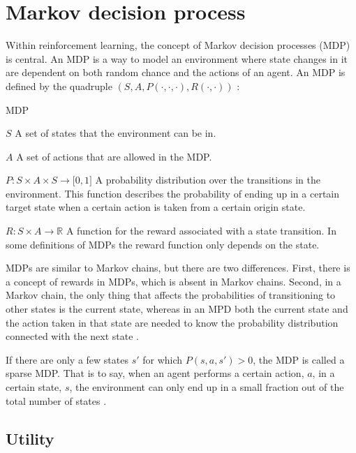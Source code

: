 \section{Markov decision process}
\label{sec:mdps}

Within reinforcement learning, the concept of Markov decision processes (MDP) is central. An MDP is a way to model an environment where state changes in it are dependent on both random chance and the actions of an agent. An MDP is defined by the quadruple $\left( S, A, P( \cdot , \cdot, \cdot ) , R( \cdot , \cdot ) \right)$ \parencite{altman2002applications}:

\begin{definition}{MDP}

$S$ \quad A set of states that the environment can be in.

$A$ \quad A set of actions that are allowed in the MDP.

$P \colon S \times A \times S \to \mathbb \lbrack0, 1\rbrack$ \quad
    A probability distribution over the transitions in the environment. This
    function describes the probability of ending up in a certain target state
    when a certain action is taken from a certain origin state. 

$R \colon S \times A \to \mathbb{R}$ \quad
    A function for the reward associated with a state transition. In some
    definitions of MDPs the reward function only depends on the state.
\end{definition}

MDPs are similar to Markov chains, but there are two differences. First, there
is a concept of rewards in MDPs, which is absent in Markov chains. Second, in a
Markov chain, the only thing that affects the probabilities of transitioning to
other states is the current state, whereas in an MPD both the current state and
the action taken in that state are needed to know the probability distribution
connected with the next state \parencite{altman2002applications}.

If there are only a few states $s'$ for which $P(s, a, s') > 0$, the MDP is called a sparse MDP. That is to say, when an agent performs a certain action, $a$, in a certain state, $s$, the environment can only end up in a small fraction out of the total number of states \parencite{dietterich2013pac}. 

\subsection{Utility}
\label{theBestLabelEvah}
\label{sec:utility}


